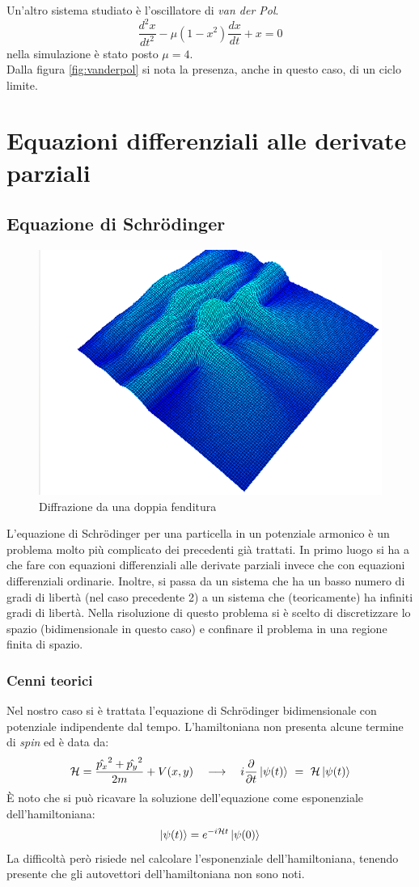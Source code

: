 Un'altro sistema studiato è l'oscillatore di \emph{van der Pol}.
$$
\frac{d^2x}{dt^2}-\mu(1-x^2)\frac{dx}{dt}+x = 0
$$
nella simulazione è stato posto $\mu = 4$.\\
Dalla figura \ref{fig:vanderpol} si nota la presenza, anche in questo caso, di un ciclo limite.
\chapter{Equazioni differenziali alle derivate parziali}
\section{Equazione di Schr\"{o}dinger}
\begin{figure}[H]
\centering
\includegraphics[width=0.6\columnwidth]{doppiafenditura.png}
\caption{\small{Diffrazione da una doppia fenditura}}
\end{figure}

L'equazione di Schr\"{o}dinger per una particella in un potenziale armonico è un problema molto più complicato dei precedenti già trattati.
In primo luogo si ha a che fare con equazioni differenziali alle derivate parziali invece che con equazioni differenziali ordinarie.
Inoltre, si passa da un sistema che ha un basso numero di gradi di libertà (nel caso precedente 2) a un sistema che (teoricamente) ha infiniti gradi di libertà.
Nella risoluzione di questo problema si è scelto di discretizzare lo spazio (bidimensionale in questo caso) e confinare il problema in una regione finita di spazio.
\subsection{Cenni teorici}
Nel nostro caso si è trattata l'equazione di Schr\"odinger bidimensionale con potenziale indipendente dal tempo. L'hamiltoniana non presenta alcune termine di \emph{spin} ed è data da:
$$
\mathcal{H} = \frac{\hat{p_x}^2+\hat{p_y}^2}{2m} + V(x,y) \quad \longrightarrow \quad i \p{}{t}\ket{\psi(t)} \ = \ \mathcal{H} \ket{\psi(t)}
$$
È noto che si può ricavare la soluzione dell'equazione come esponenziale dell'hamiltoniana:
$$
\left| \psi(t) \right> = e^{ -i \mathcal{H} t} \left| \psi(0) \right>
$$
La difficoltà però risiede nel calcolare l'esponenziale dell'hamiltoniana, tenendo presente che gli autovettori dell'hamiltoniana non sono noti.
